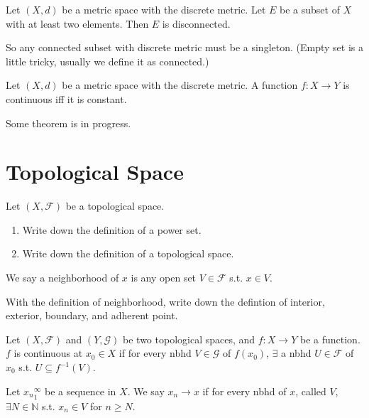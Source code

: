 \documentclass[12pt]{article}
\begin{document}
\begin{property}
    Let $(X,d)$ be a metric space with the discrete metric.
    Let $E$ be a subset of $X$ with at least two elements. Then $E$ is disconnected.
\end{property}
So any connected subset with discrete metric must be a singleton. 
(Empty set is a little tricky, usually we define it as connected.)

\begin{corollary}
    Let $(X,d)$ be a metric space with the discrete metric.
    A function $f:X\rightarrow Y$ is continuous iff it is constant.
\end{corollary}

Some theorem is in progress.


\section{Topological Space}


\begin{exercise}
    Let $(X,\mathcal{F})$ be a topological space.
    \begin{enumerate}
        \item Write down the definition of a power set.
        \item Write down the definition of a topological space. 
    \end{enumerate}
\end{exercise}

\begin{definition}[Neighborhood]
    We say a neighborhood of $x$ is any open set $V\in\mathcal{F}$ s.t. $x\in V$.
\end{definition}

\begin{exercise}
    With the definition of neighborhood, write down the defintion of interior, exterior, boundary, and adherent point.
\end{exercise}


\begin{definition}[Continuity]
    Let $(X,\mathcal{F})$ and $(Y,\mathcal{G})$ be two topological spaces, and $f: X\rightarrow Y$ be a function.
    $f$ is continuous at $x_0\in X$ if for every nbhd $V\in \mathcal{G}$ of $f(x_0)$, $\exists$ a nbhd $U\in \mathcal{F}$ of $x_0$ s.t. $U\subseteq f^{-1}(V).$ 
\end{definition}

\begin{definition}
    Let ${x_n}^\infty_1$ be a sequence in $X$. We say $x_n\rightarrow x$ if for every nbhd of $x$, called $V$, $\exists N\in\mathbb{N}$ s.t. $x_n\in V$ for $n\geq N$.
\end{definition}
\end{document}
